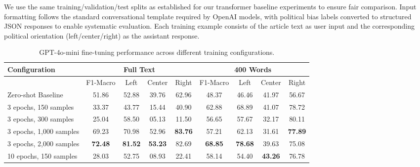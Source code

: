 We use the same training/validation/test splits as established for our transformer baseline experiments to ensure fair comparison. Input formatting follows the standard conversational template required by OpenAI models, with political bias labels converted to structured JSON responses to enable systematic evaluation. Each training example consists of the article text as user input and the corresponding political orientation (left/center/right) as the assistant response.

\begin{table}[ht]
\centering
\small
\begin{tabular}{@{}lcccccccc@{}}
\toprule
\textbf{Configuration} & \multicolumn{4}{c}{\textbf{Full Text}} & \multicolumn{4}{c}{\textbf{400 Words}} \\
\midrule
 & F1-Macro & Left & Center & Right & F1-Macro & Left & Center & Right \\
 \midrule
Zero-shot Baseline & 51.86 & 52.88 & 39.76 & 62.96 & 48.37 & 46.46 & 41.97 & 56.67  \\
3 epochs, 150 samples & 33.37 &  43.77 & 15.44 & 40.90 & 62.88 & 68.89 & 41.07 & 78.72 \\
3 epochs, 300 samples & 25.04 & 58.50 & 05.13 & 11.50 & 56.65 & 57.67 & 32.17 & 80.11 \\
3 epochs, 1,000 samples & 69.23 & 70.98 & 52.96 & \textbf{83.76} & 57.21 & 62.13 & 31.61 & \textbf{77.89}  \\
3 epochs, 2,000 samples & \textbf{72.48} & \textbf{81.52} & \textbf{53.23} & 82.69 & \textbf{68.85} & \textbf{78.68} & 39.63 & 75.08  \\
10 epochs, 150 samples & 28.03 & 52.75 & 08.93 & 22.41 & 58.14 & 54.40 & \textbf{43.26} & 76.78 \\
\bottomrule
\end{tabular}
\caption{GPT-4o-mini fine-tuning performance across different training configurations.}
\label{tab:llm_detailed_results}
\end{table}
